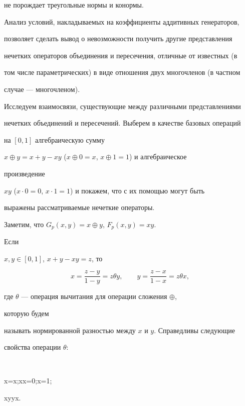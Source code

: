 не порождает треугольные нормы и конормы.





Анализ условий, накладываемых на коэффициенты аддитивных генераторов,


позволяет сделать вывод о невозможности получить другие представления


нечетких операторов объединения и пересечения, отличные от известных (в


том числе параметрических) в виде отношения двух многочленов (в частном


случае --- многочленом).





Исследуем взаимосвязи, существующие между различными представлениями


нечетких объединений и пересечений. Выберем в качестве базовых операций


на $[0,1]$ алгебраическую сумму


$x\oplus y=x+y-xy$ ($x\oplus 0=x$, $x\oplus 1=1$) и алгебраическое


произведение


$xy$ ($x\cdot 0=0$, $x\cdot 1=1$) и покажем, что с их помощью могут быть


выражены рассматриваемые нечеткие операторы.





Заметим, что $G_p(x,y)=x\oplus y$, $F_p(x,y)=xy$. 





Если


$x,y\in[0,1]$, $x+y-xy=z$, то


$$


x=\frac{z-y}{1-y}=z\theta y,\qquad


y=\frac{z-x}{1-x}=z\theta x,


$$


где $\theta$ --- операция вычитания для операции сложения $\oplus$,


которую будем


называть нормированной разностью между $x$ и $y$. Справедливы следующие


свойства операции $\theta$:


$$


x=x;\quad x\theta x=0;\theta x=1;\quad


x\theta y\ne y\theta x.


